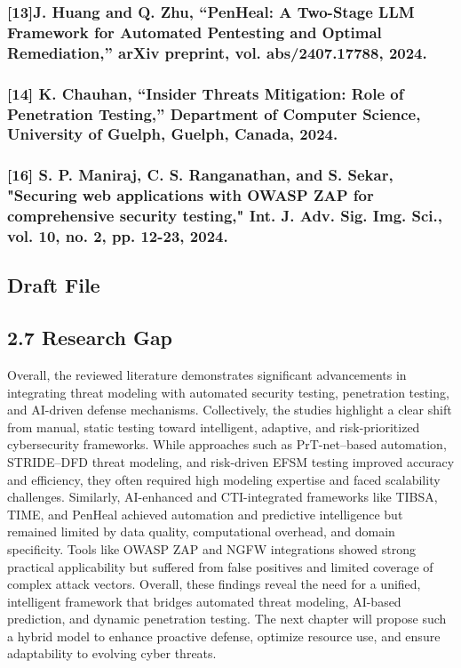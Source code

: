 \documentclass[12pt,a4paper]{report}
\begin{document}
\subsubsection{[13]J. Huang and Q. Zhu, “PenHeal: A Two-Stage LLM Framework for Automated Pentesting and Optimal Remediation,” arXiv preprint, vol. abs/2407.17788, 2024.}

\subsubsection{[14]  K. Chauhan, “Insider Threats Mitigation: Role of Penetration Testing,” Department of Computer Science, University of Guelph, Guelph, Canada, 2024.}

\subsubsection{[16] S. P. Maniraj, C. S. Ranganathan, and S. Sekar, "Securing web applications with OWASP ZAP for comprehensive security testing," Int. J. Adv. Sig. Img. Sci., vol. 10, no. 2, pp. 12-23, 2024.}

\subsection{Draft File}

\subsection{2.7 Research Gap}

Overall, the reviewed literature demonstrates significant advancements in integrating threat modeling with automated security testing, penetration testing, and AI-driven defense mechanisms. Collectively, the studies highlight a clear shift from manual, static testing toward intelligent, adaptive, and risk-prioritized cybersecurity frameworks. While approaches such as PrT-net–based automation, STRIDE–DFD threat modeling, and risk-driven EFSM testing improved accuracy and efficiency, they often required high modeling expertise and faced scalability challenges. Similarly, AI-enhanced and CTI-integrated frameworks like TIBSA, TIME, and PenHeal achieved automation and predictive intelligence but remained limited by data quality, computational overhead, and domain specificity. Tools like OWASP ZAP and NGFW integrations showed strong practical applicability but suffered from false positives and limited coverage of complex attack vectors. Overall, these findings reveal the need for a unified, intelligent framework that bridges automated threat modeling, AI-based prediction, and dynamic penetration testing. The next chapter will propose such a hybrid model to enhance proactive defense, optimize resource use, and ensure adaptability to evolving cyber threats.
\end{document}
